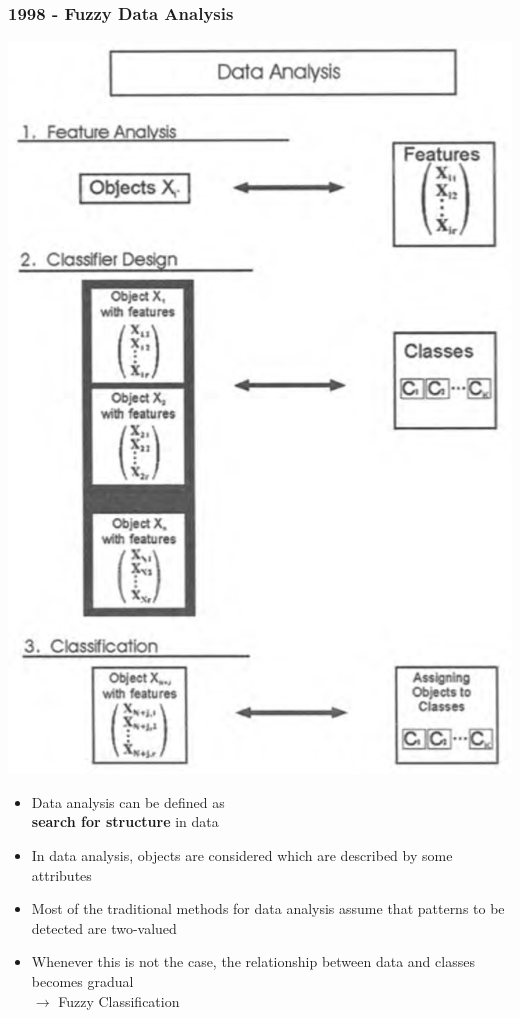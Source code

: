 \documentclass[a4paper]{article}
\begin{document}
			\subsubsection{1998 - Fuzzy Data Analysis}
			
			\begin{minipage}[c]{0.3\textwidth}
				\centering
				\includegraphics[width=.8\textwidth]{img/sw01/fda.png}
			\end{minipage}
			\hfill
			\begin{minipage}[c]{0.6\textwidth}
				\begin{itemize}
					\item Data analysis can be defined as  \\
						\textbf{search for structure} in data
					\item In data analysis, objects are considered which are described by some attributes
					\item Most of the traditional methods for data analysis assume that patterns to be detected are two-valued
					\item Whenever this is not the case, the relationship between data and classes becomes gradual \\
						$\rightarrow$ Fuzzy Classification
				\end{itemize}
			\end{minipage}
			
\end{document}
